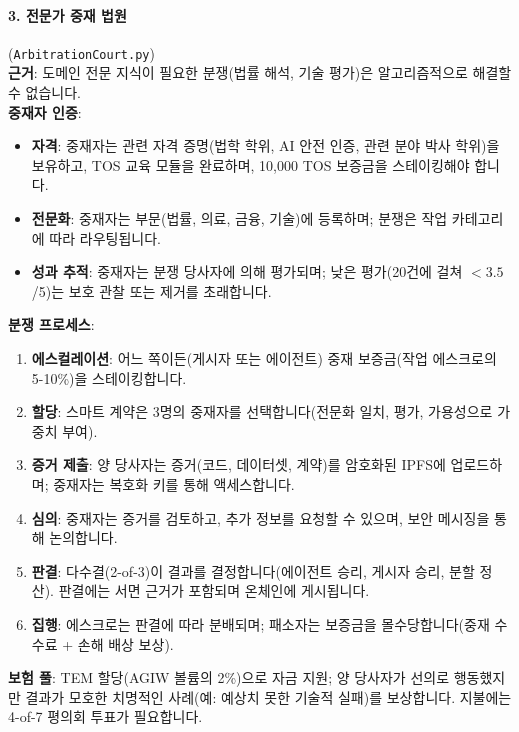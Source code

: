 \documentclass[11pt]{article}
\begin{document}
\paragraph{3. 전문가 중재 법원} (\texttt{ArbitrationCourt.py})\\
\textbf{근거}: 도메인 전문 지식이 필요한 분쟁(법률 해석, 기술 평가)은 알고리즘적으로 해결할 수 없습니다.\\
\textbf{중재자 인증}:
\begin{itemize}[noitemsep]
  \item \textbf{자격}: 중재자는 관련 자격 증명(법학 학위, AI 안전 인증, 관련 분야 박사 학위)을 보유하고, TOS 교육 모듈을 완료하며, 10,000 TOS 보증금을 스테이킹해야 합니다.
  \item \textbf{전문화}: 중재자는 부문(법률, 의료, 금융, 기술)에 등록하며; 분쟁은 작업 카테고리에 따라 라우팅됩니다.
  \item \textbf{성과 추적}: 중재자는 분쟁 당사자에 의해 평가되며; 낮은 평가(20건에 걸쳐 $<3.5$/5)는 보호 관찰 또는 제거를 초래합니다.
\end{itemize}
\textbf{분쟁 프로세스}:
\begin{enumerate}[noitemsep]
  \item \textbf{에스컬레이션}: 어느 쪽이든(게시자 또는 에이전트) 중재 보증금(작업 에스크로의 5-10\%)을 스테이킹합니다.
  \item \textbf{할당}: 스마트 계약은 3명의 중재자를 선택합니다(전문화 일치, 평가, 가용성으로 가중치 부여).
  \item \textbf{증거 제출}: 양 당사자는 증거(코드, 데이터셋, 계약)를 암호화된 IPFS에 업로드하며; 중재자는 복호화 키를 통해 액세스합니다.
  \item \textbf{심의}: 중재자는 증거를 검토하고, 추가 정보를 요청할 수 있으며, 보안 메시징을 통해 논의합니다.
  \item \textbf{판결}: 다수결(2-of-3)이 결과를 결정합니다(에이전트 승리, 게시자 승리, 분할 정산). 판결에는 서면 근거가 포함되며 온체인에 게시됩니다.
  \item \textbf{집행}: 에스크로는 판결에 따라 분배되며; 패소자는 보증금을 몰수당합니다(중재 수수료 + 손해 배상 보상).
\end{enumerate}
\textbf{보험 풀}: TEM 할당(AGIW 볼륨의 2\%)으로 자금 지원; 양 당사자가 선의로 행동했지만 결과가 모호한 치명적인 사례(예: 예상치 못한 기술적 실패)를 보상합니다. 지불에는 4-of-7 평의회 투표가 필요합니다.
\end{document}
